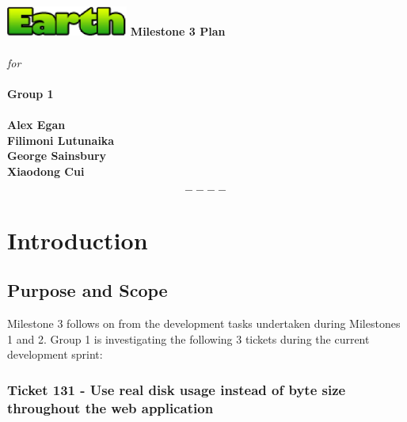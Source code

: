 \documentclass[10pt,a4,oneside]{article}
\begin{document}
\begin{titlepage}
\begin{center}
\includegraphics[width=40mm]{figs/earth}
\vfill
\textbf{\huge Milestone 3 Plan}\\ \textit{} \\ \textit{} 
\textit{for} \\ \textit{} \\ \textit{} 
\textbf{\huge Group 1}\\ \textit{} \\ \textit{}
\vfill
\textbf{Alex Egan \\ Filimoni Lutunaika \\ George Sainsbury \\ Xiaodong Cui}
\end{center}
\end{titlepage}
 


\newpage

\tableofcontents

\[----\]

\paragraph{}

\listoffigures
 
\newpage

\section{Introduction} 
 
\subsection{Purpose and Scope}

\label{subsec:purpose-and-scope}
 
Milestone 3 follows on from the development tasks undertaken during Milestones 1 and 2.
Group 1 is investigating the following 3 tickets during the current development sprint:

\subsubsection*{Ticket 131 - Use real disk usage instead of byte size throughout the web application}
\end{document}
